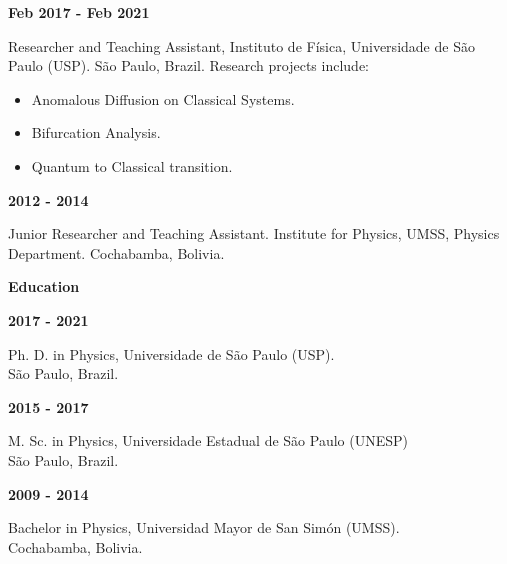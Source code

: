 \documentclass[a4paper,12pt,final]{memoir}
\newcommand{\SmallSep}{\vspace{0.5em}}
\newcommand{\CVSection}[1]
	{\Large\textbf{#1}\par
	\SmallSep\normalsize\normalfont}
\newcommand{\CVItem}[1]
	{\textbf{\color{RoyalBlue} #1}}
\begin{document}
\CVItem{Feb 2017 - Feb 2021}\\
\begin{small}
Researcher and Teaching Assistant,  Instituto de F\'{i}sica, Universidade de S\~{a}o Paulo 
(USP). S\~{a}o Paulo, Brazil. 
Research projects include: 
\end{small}
\begin{footnotesize}
\begin{itemize}
\item Anomalous Diffusion on Classical Systems.
\item Bifurcation Analysis.
\item Quantum to Classical transition.
\end{itemize}
\end{footnotesize}

\SmallSep


\CVItem{ 2012 - 2014}\\
\begin{small}
Junior Researcher and Teaching Assistant. Institute for Physics,
UMSS, Physics Department. Cochabamba, Bolivia. 
\end{small}

\SmallSep

\CVSection{Education}
\CVItem{2017 - 2021}\\
\begin{small}
 Ph. D. in Physics, Universidade de S\~{a}o Paulo (USP).\\ 
S\~{a}o Paulo, Brazil.
 \end{small} 
\SmallSep

\CVItem{2015 - 2017}\\
\begin{small}
M. Sc. in Physics, Universidade Estadual de S\~{a}o Paulo (UNESP)\\
S\~{a}o Paulo, Brazil.
\end{small}
\SmallSep

\CVItem{2009 - 2014}\\
\begin{small}
Bachelor in Physics, Universidad Mayor de San Sim\'{o}n (UMSS).\\
Cochabamba, Bolivia.
\end{small}

\SmallSep
\end{document}

